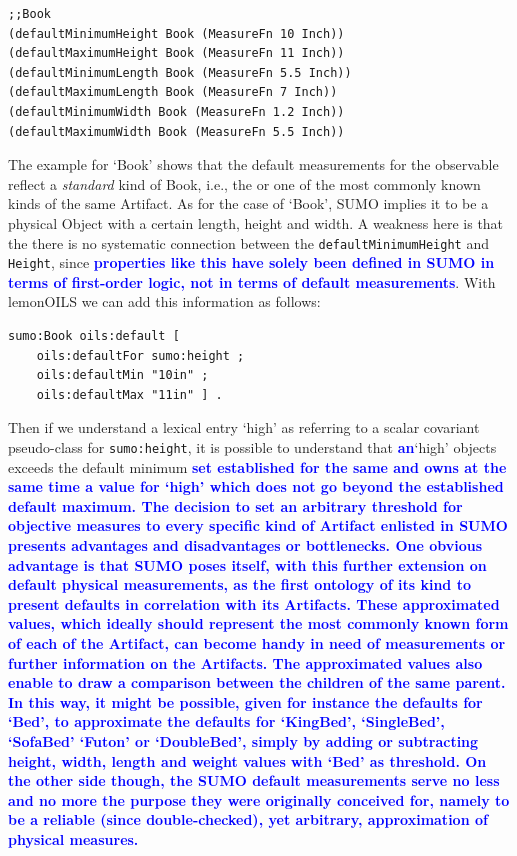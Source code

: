 \documentclass[11pt]{article}
\begin{document}
\begin{verbatim}
;;Book
(defaultMinimumHeight Book (MeasureFn 10 Inch))
(defaultMaximumHeight Book (MeasureFn 11 Inch))
(defaultMinimumLength Book (MeasureFn 5.5 Inch))
(defaultMaximumLength Book (MeasureFn 7 Inch))
(defaultMinimumWidth Book (MeasureFn 1.2 Inch))
(defaultMaximumWidth Book (MeasureFn 5.5 Inch))
\end{verbatim}


The example for `Book' shows that the default measurements for the observable reflect a \textit{standard} kind of Book,
i.e., the or one of the most commonly known kinds of the same Artifact. As for the case of `Book', SUMO implies it to be a physical Object with a certain length, height and width. 
A weakness here is that the there is no systematic connection between the {\tt defaultMinimumHeight} and {\tt Height}, since \textbf{\textcolor{blue}{properties like this have solely been defined in SUMO in terms of first-order logic, not in terms of default measurements}}. With lemonOILS we can add this information as follows:

\begin{verbatim}
sumo:Book oils:default [
    oils:defaultFor sumo:height ;
    oils:defaultMin "10in" ;
    oils:defaultMax "11in" ] .
\end{verbatim}

Then if we understand a lexical entry `high' as referring to a scalar covariant pseudo-class for {\tt sumo:height},
it is possible to understand that \textbf{\textcolor{blue}{an}}`high' objects exceeds the default minimum \textbf{\textcolor{blue}{set established for the same and owns at the same time a value for `high' which does not go beyond the established default maximum. The decision to set an arbitrary threshold for objective measures to every specific kind of Artifact enlisted in SUMO presents advantages and disadvantages or bottlenecks. One obvious advantage is that SUMO poses itself, with this further extension on default physical measurements, as the first ontology of its kind to present defaults in correlation with its Artifacts. These approximated values, which ideally should represent the most commonly known form of each of the Artifact, can become handy in need of measurements or further information on the Artifacts. The approximated values also enable to draw a comparison between the children of the same parent. In this way, it might be possible, given for instance the defaults for `Bed', to approximate the defaults for `KingBed', `SingleBed', `SofaBed' `Futon' or `DoubleBed', simply by adding or subtracting height, width, length and weight values with `Bed' as threshold. On the other side though, the SUMO default measurements serve no less and no more the purpose they were originally conceived for, namely to be a reliable (since double-checked), yet arbitrary, approximation of physical measures.}}
\end{document}
